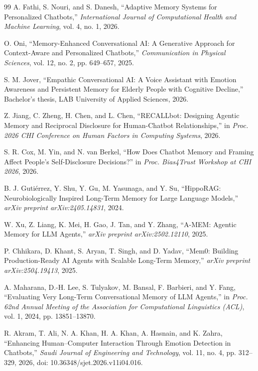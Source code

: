 \documentclass[graybox]{svmult}
\begin{document}
\begin{thebibliography}{99}
A. Fathi, S. Nouri, and S. Danesh, ``Adaptive Memory Systems for
Personalized Chatbots,'' \textit{International Journal of Computational
Health and Machine Learning}, vol. 4, no. 1, 2026.

O. Oni, ``Memory-Enhanced Conversational AI: A Generative Approach for
Context-Aware and Personalized Chatbots,'' \textit{Communication in
Physical Sciences}, vol. 12, no. 2, pp. 649--657, 2025.

S. M. Jover, ``Empathic Conversational AI: A Voice Assistant with Emotion
Awareness and Persistent Memory for Elderly People with Cognitive
Decline,'' Bachelor's thesis, LAB University of Applied Sciences, 2026.

Z. Jiang, C. Zheng, H. Chen, and L. Chen, ``RECALLbot: Designing Agentic
Memory and Reciprocal Disclosure for Human-Chatbot Relationships,'' in
\textit{Proc. 2026 CHI Conference on Human Factors in Computing Systems},
2026.

S. R. Cox, M. Yin, and N. van Berkel, ``How Does Chatbot Memory and
Framing Affect People's Self-Disclosure Decisions?'' in \textit{Proc.
Bias4Trust Workshop at CHI 2026}, 2026.

B. J. Guti\'errez, Y. Shu, Y. Gu, M. Yasunaga, and Y. Su, ``HippoRAG:
Neurobiologically Inspired Long-Term Memory for Large Language Models,''
\textit{arXiv preprint arXiv:2405.14831}, 2024.

W. Xu, Z. Liang, K. Mei, H. Gao, J. Tan, and Y. Zhang, ``A-MEM: Agentic
Memory for LLM Agents,'' \textit{arXiv preprint arXiv:2502.12110}, 2025.

P. Chhikara, D. Khant, S. Aryan, T. Singh, and D. Yadav, ``Mem0:
Building Production-Ready AI Agents with Scalable Long-Term Memory,''
\textit{arXiv preprint arXiv:2504.19413}, 2025.

A. Maharana, D.-H. Lee, S. Tulyakov, M. Bansal, F. Barbieri, and
Y. Fang, ``Evaluating Very Long-Term Conversational Memory of LLM
Agents,'' in \textit{Proc. 62nd Annual Meeting of the Association for
Computational Linguistics (ACL)}, vol. 1, 2024, pp. 13851--13870.

R. Akram, T. Ali, N. A. Khan, H. A. Khan, A. Hasnain, and K. Zahra,
``Enhancing Human--Computer Interaction Through Emotion Detection in
Chatbots,'' \textit{Saudi Journal of Engineering and Technology}, vol. 11,
no. 4, pp. 312--329, 2026, doi: 10.36348/sjet.2026.v11i04.016.


\end{thebibliography}
\end{document}
